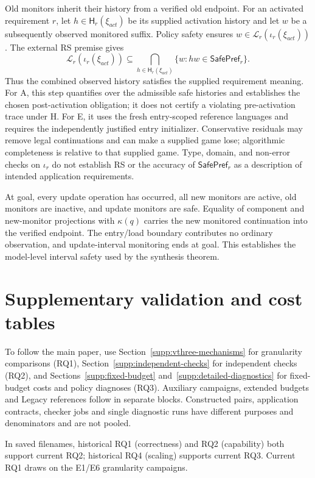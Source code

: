 \documentclass[11pt]{article}
\begin{document}
Old monitors inherit their history from a verified old endpoint. For an activated requirement $r$, let $h\in\mathsf H_r(\xi_{act})$ be its supplied activation history and let $w$ be a subsequently observed monitored suffix. Policy safety ensures $w\in\mathcal L_r(\iota_r(\xi_{act}))$. The external RS premise gives
\[
\mathcal L_r(\iota_r(\xi_{act}))
\subseteq\bigcap_{h\in\mathsf H_r(\xi_{act})}
\{w:hw\in\mathsf{SafePref}_r\}.
\]
Thus the combined observed history satisfies the supplied requirement meaning. For A, this step quantifies over the admissible safe histories and establishes the chosen post-activation obligation; it does not certify a violating pre-activation trace under H. For E, it uses the fresh entry-scoped reference languages and requires the independently justified entry initializer. Conservative residuals may remove legal continuations and can make a supplied game lose; algorithmic completeness is relative to that supplied game. Type, domain, and non-error checks on $\iota_r$ do not establish RS or the accuracy of $\mathsf{SafePref}_r$ as a description of intended application requirements.

At goal, every update operation has occurred, all new monitors are active, old monitors are inactive, and update monitors are safe. Equality of component and new-monitor projections with $\kappa(q)$ carries the new monitored continuation into the verified endpoint. The entry/load boundary contributes no ordinary observation, and update-interval monitoring ends at goal. This establishes the model-level interval safety used by the synthesis theorem.

\clearpage
\section{Supplementary validation and cost tables}
\label{supp:tables}
To follow the main paper, use Section~\ref{supp:vthree-mechanisms} for granularity comparisons (RQ1), Section~\ref{supp:independent-checks} for independent checks (RQ2), and Sections~\ref{supp:fixed-budget} and~\ref{supp:detailed-diagnostics} for fixed-budget costs and policy diagnoses (RQ3). Auxiliary campaigns, extended budgets and Legacy references follow in separate blocks. Constructed pairs, application contracts, checker jobs and single diagnostic runs have different purposes and denominators and are not pooled.

In saved filenames, historical RQ1 (correctness) and RQ2 (capability) both support current RQ2; historical RQ4 (scaling) supports current RQ3. Current RQ1 draws on the E1/E6 granularity campaigns.
\end{document}
